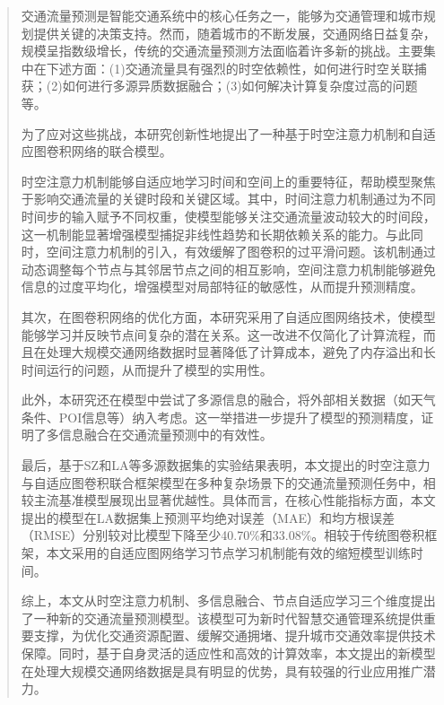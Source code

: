 
\begin{abstract}
  交通流量预测是智能交通系统中的核心任务之一，能够为交通管理和城市规划提供关键的决策支持。然而，随着城市的不断发展，交通网络日益复杂，规模呈指数级增长，传统的交通流量预测方法面临着许多新的挑战。主要集中在下述方面：(1)交通流量具有强烈的时空依赖性，如何进行时空关联捕获；(2)如何进行多源异质数据融合；(3)如何解决计算复杂度过高的问题等。

为了应对这些挑战，本研究创新性地提出了一种基于时空注意力机制和自适应图卷积网络的联合模型。

时空注意力机制能够自适应地学习时间和空间上的重要特征，帮助模型聚焦于影响交通流量的关键时段和关键区域。其中，时间注意力机制通过为不同时间步的输入赋予不同权重，使模型能够关注交通流量波动较大的时间段，这一机制能显著增强模型捕捉非线性趋势和长期依赖关系的能力。与此同时，空间注意力机制的引入，有效缓解了图卷积的过平滑问题。该机制通过动态调整每个节点与其邻居节点之间的相互影响，空间注意力机制能够避免信息的过度平均化，增强模型对局部特征的敏感性，从而提升预测精度。

其次，在图卷积网络的优化方面，本研究采用了自适应图网络技术，使模型能够学习并反映节点间复杂的潜在关系。这一改进不仅简化了计算流程，而且在处理大规模交通网络数据时显著降低了计算成本，避免了内存溢出和长时间运行的问题，从而提升了模型的实用性。

此外，本研究还在模型中尝试了多源信息的融合，将外部相关数据（如天气条件、POI信息等）纳入考虑。这一举措进一步提升了模型的预测精度，证明了多信息融合在交通流量预测中的有效性。

最后，基于SZ和LA等多源数据集的实验结果表明，本文提出的时空注意力与自适应图卷积联合框架模型在多种复杂场景下的交通流量预测任务中，相较主流基准模型展现出显著优越性。具体而言，在核心性能指标方面，本文提出的模型在LA数据集上预测平均绝对误差（MAE）和均方根误差（RMSE）分别较对比模型下降至少40.70\%和33.08\%。相较于传统图卷积框架，本文采用的自适应图网络学习节点学习机制能有效的缩短模型训练时间。

综上，本文从时空注意力机制、多信息融合、节点自适应学习三个维度提出了一种新的交通流量预测模型。该模型可为新时代智慧交通管理系统提供重要支撑，为优化交通资源配置、缓解交通拥堵、提升城市交通效率提供技术保障。同时，基于自身灵活的适应性和高效的计算效率，本文提出的新模型在处理大规模交通网络数据是具有明显的优势，具有较强的行业应用推广潜力。
\end{abstract}



